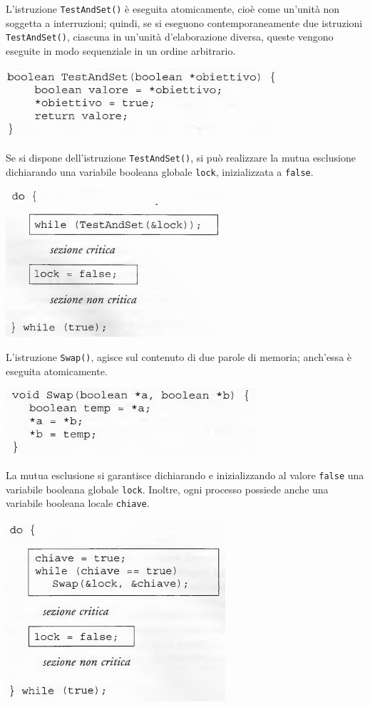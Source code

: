 \documentclass[11pt,a4paper]{article}
\begin{document}
L'istruzione \texttt{TestAndSet()} è eseguita atomicamente, cioè come un'unità non soggetta a interruzioni; quindi,
se si eseguono contemporaneamente due istruzioni \texttt{TestAndSet()}, ciascuna in un'unità
d'elaborazione diversa, queste vengono eseguite in modo sequenziale in un ordine arbitra­rio.
\begin{center}
  \includegraphics[scale=0.6]{img/0024.png}
\end{center}
Se si dispone dell'istruzione \texttt{TestAndSet()}, si può realizzare la mutua esclusione di­chiarando una variabile booleana globale \texttt{lock}, inizializzata a \texttt{false}.
\begin{center}
  \includegraphics[scale=0.6]{img/0025.png}
\end{center}
%
L'istruzione \texttt{Swap()}, agisce sul contenuto di due parole di
memoria; anch'essa è eseguita atomicamente.
\begin{center}
  \includegraphics[scale=0.6]{img/0026.png}
\end{center}
La mutua esclusione si garantisce dichiarando e inizializzando al
valore \texttt{false} una variabile booleana globale \texttt{lock}. Inoltre, ogni processo possiede anche una
variabile booleana locale \texttt{chiave}.
\begin{center}
  \includegraphics[scale=0.6]{img/0027.png}
\end{center}
\end{document}
